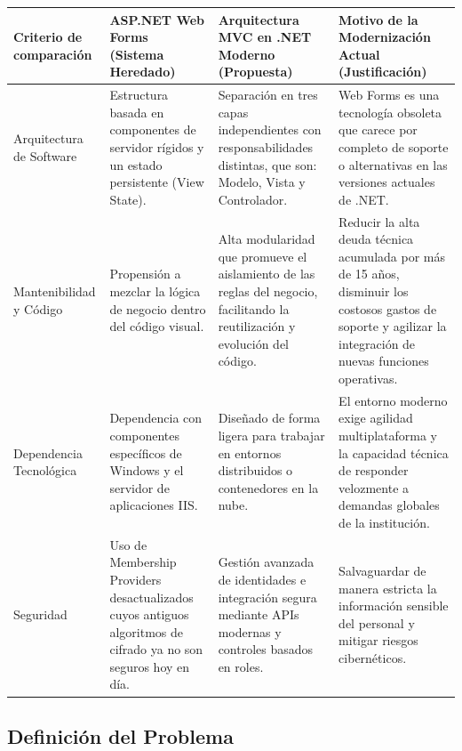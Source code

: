 \begin{table}[H]
    \centering
    \caption{Tabla Comparativa de Tecnologías y Justificación de Modernización.}
    \label{tab:tabla_tecnologias}
    \small
    \begin{longtable}{|p{2.8cm}|p{4.2cm}|p{4.2cm}|p{5.3cm}|}
        \hline
        \textbf{Criterio de comparación} & \textbf{ASP.NET Web Forms (Sistema Heredado)} & \textbf{Arquitectura MVC en .NET Moderno (Propuesta)} & \textbf{Motivo de la Modernización Actual (Justificación)} \\
        \hline
        Arquitectura de Software & Estructura basada en componentes de servidor rígidos y un estado persistente (View State). & Separación en tres capas independientes con responsabilidades distintas, que son: Modelo, Vista y Controlador. & Web Forms es una tecnología obsoleta que carece por completo de soporte o alternativas en las versiones actuales de .NET.\\ \hline
        Mantenibilidad y Código & Propensión a mezclar la lógica de negocio dentro del código visual. & Alta modularidad que promueve el aislamiento de las reglas del negocio, facilitando la reutilización y evolución del código. & Reducir la alta deuda técnica acumulada por más de 15 años, disminuir los costosos gastos de soporte y agilizar la integración de nuevas funciones operativas. \\ \hline
        Dependencia Tecnológica & Dependencia con componentes específicos de Windows y el servidor de aplicaciones IIS. & Diseñado de forma ligera para trabajar en entornos distribuidos o contenedores en la nube. & El entorno moderno exige agilidad multiplataforma y la capacidad técnica de responder velozmente a demandas globales de la institución. \\ \hline
        Seguridad & Uso de Membership Providers desactualizados cuyos antiguos algoritmos de cifrado ya no son seguros hoy en día. & Gestión avanzada de identidades e integración segura mediante APIs modernas y controles basados en roles. & Salvaguardar de manera estricta la información sensible del personal y mitigar riesgos cibernéticos. \\
        \hline
    \end{longtable}
\end{table}

\subsection{Definición del Problema}
\label{sec:problema}

